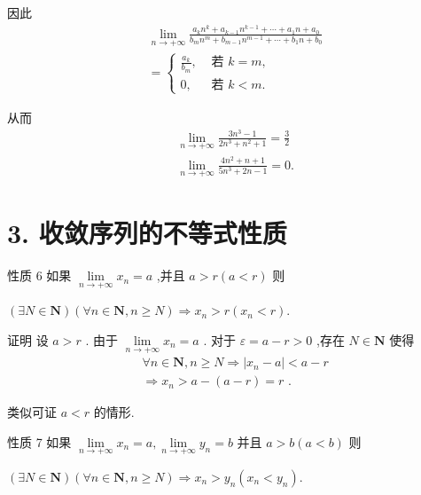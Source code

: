 因此
\begin{align*}
	&\mathop{\lim }\limits_{{n \rightarrow   + \infty }}\frac{{a}_{k}{n}^{k} + {a}_{k - 1}{n}^{k - 1} + \cdots  + {a}_{1}n + {a}_{0}}{{b}_{m}{n}^{m} + {b}_{m - 1}{n}^{m - 1} + \cdots  + {b}_{1}n + {b}_{0}}\\
	&= \left\{  \begin{array}{ll} \frac{{a}_{k}}{{b}_{m}}, & \text{ 若 }k = m, \\  0, & \text{ 若 }k < m. \end{array}\right.
\end{align*}

从而
\begin{align*}
	&\mathop{\lim }\limits_{{n \rightarrow   + \infty }}\frac{3{n}^{3} - 1}{2{n}^{3} + {n}^{2} + 1} = \frac{3}{2}\\
	&\mathop{\lim }\limits_{{n \rightarrow   + \infty }}\frac{4{n}^{2} + n + 1}{5{n}^{3} + {2n} - 1} = 0.
\end{align*}

\section*{3. 收敛序列的不等式性质}

性质 6 如果 $\mathop{\lim }\limits_{{n \rightarrow   + \infty }}{x}_{n} = a$ ,并且 $a > r\left( {a < r}\right)$ 则

$\left( {\exists N \in  \mathbf{N}}\right) \left( {\forall n \in  \mathbf{N},n \geq  N}\right)  \Rightarrow  {x}_{n} > r\left( {{x}_{n} < r}\right) .$

证明 设 $a > r$ . 由于 $\mathop{\lim }\limits_{{n \rightarrow   + \infty }}{x}_{n} = a$ . 对于 $\varepsilon  = a - r > 0$ ,存在 $N \in  \mathbf{N}$ 使得
\begin{align*}
	&\forall n \in  \mathbf{N},n \geq  N \Rightarrow  \left| {{x}_{n} - a}\right|  < a - r\\
	&\Rightarrow  {x}_{n} > a - \left( {a - r}\right)  = r\text{ . }
\end{align*}

类似可证 $a < r$ 的情形.

性质 7 如果 $\mathop{\lim }\limits_{{n \rightarrow   + \infty }}{x}_{n} = a,\mathop{\lim }\limits_{{n \rightarrow   + \infty }}{y}_{n} = b$ 并且 $a > b\left( {a < b}\right)$ 则

$\left( {\exists N \in  \mathbf{N}}\right) \left( {\forall n \in  \mathbf{N},n \geq  N}\right)  \Rightarrow  {x}_{n} > {y}_{n}\left( {{x}_{n} < {y}_{n}}\right) .$

